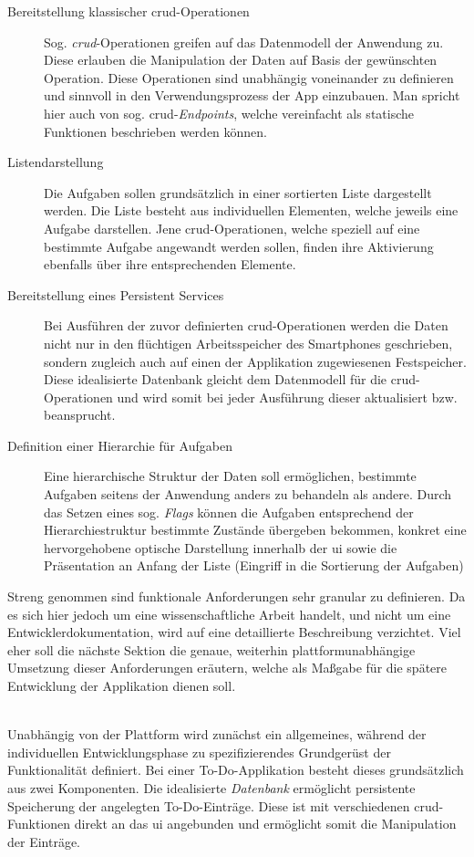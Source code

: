 \begin{description}
    \item[Bereitstellung klassischer \acs{crud}-Operationen] Sog. \textit{\ac{crud}}-Operationen greifen auf das Datenmodell der Anwendung zu. Diese erlauben die Manipulation der Daten auf Basis der gewünschten Operation. Diese Operationen sind unabhängig voneinander zu definieren und sinnvoll in den Verwendungsprozess der App einzubauen. Man spricht hier auch von sog. \ac{crud}-\textit{Endpoints}, welche vereinfacht als statische Funktionen beschrieben werden können.
    \item[Listendarstellung] Die Aufgaben sollen grundsätzlich in einer sortierten Liste dargestellt werden. Die Liste besteht aus individuellen Elementen, welche jeweils eine Aufgabe darstellen. Jene \ac{crud}-Operationen, welche speziell auf eine bestimmte Aufgabe angewandt werden sollen, finden ihre Aktivierung ebenfalls über ihre entsprechenden Elemente.
    \item[Bereitstellung eines Persistent Services] Bei Ausführen der zuvor definierten \ac{crud}-Operationen werden die Daten nicht nur in den flüchtigen Arbeitsspeicher des Smartphones geschrieben, sondern zugleich auch auf einen der Applikation zugewiesenen Festspeicher. Diese idealisierte Datenbank gleicht dem Datenmodell für die \ac{crud}-Operationen und wird somit bei jeder Ausführung dieser aktualisiert bzw. beansprucht.
    \item[Definition einer Hierarchie für Aufgaben] Eine hierarchische Struktur der Daten soll ermöglichen, bestimmte Aufgaben seitens der Anwendung anders zu behandeln als andere. Durch das Setzen eines sog. \textit{Flags} können die Aufgaben entsprechend der Hierarchiestruktur bestimmte Zustände übergeben bekommen, konkret eine hervorgehobene optische Darstellung innerhalb der \ac{ui} sowie die Präsentation an Anfang der Liste (Eingriff in die Sortierung der Aufgaben)
\end{description}


Streng genommen sind funktionale Anforderungen sehr granular zu definieren. Da es sich hier jedoch um eine wissenschaftliche Arbeit handelt, und nicht um eine Entwicklerdokumentation, wird auf eine detaillierte Beschreibung verzichtet. Viel eher soll die nächste Sektion die genaue, weiterhin plattformunabhängige Umsetzung dieser Anforderungen eräutern, welche als Maßgabe für die spätere Entwicklung der Applikation dienen soll. \\\

Unabhängig von der Plattform wird zunächst ein allgemeines, während der individuellen Entwicklungsphase zu spezifizierendes Grundgerüst der Funktionalität definiert. Bei einer To-Do-Applikation besteht dieses grundsätzlich aus zwei Komponenten. Die idealisierte \textit{Datenbank} ermöglicht persistente Speicherung der angelegten To-Do-Einträge. Diese ist mit verschiedenen \ac{crud}-Funktionen direkt an das \ac{ui} angebunden und ermöglicht somit die Manipulation der Einträge.